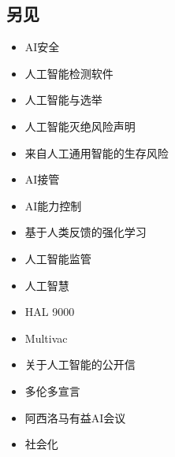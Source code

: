 \subsection{另见}
\begin{itemize}
\item AI安全
\item 人工智能检测软件
\item 人工智能与选举
\item 人工智能灭绝风险声明
\item 来自人工通用智能的生存风险
\item AI接管
\item AI能力控制
\item 基于人类反馈的强化学习
\item 人工智能监管
\item 人工智慧
\item HAL 9000
\item Multivac
\item 关于人工智能的公开信
\item 多伦多宣言
\item 阿西洛马有益AI会议
\item 社会化
\end{itemize}

